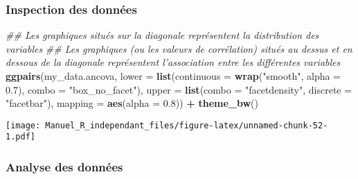 \documentclass[
]{book}
\newenvironment{Shaded}{\begin{snugshade}}{\end{snugshade}}
\newcommand{\CommentTok}[1]{\textcolor[rgb]{0.56,0.35,0.01}{\textit{#1}}}
\newcommand{\DataTypeTok}[1]{\textcolor[rgb]{0.13,0.29,0.53}{#1}}
\newcommand{\FloatTok}[1]{\textcolor[rgb]{0.00,0.00,0.81}{#1}}
\newcommand{\KeywordTok}[1]{\textcolor[rgb]{0.13,0.29,0.53}{\textbf{#1}}}
\newcommand{\NormalTok}[1]{#1}
\newcommand{\OperatorTok}[1]{\textcolor[rgb]{0.81,0.36,0.00}{\textbf{#1}}}
\newcommand{\StringTok}[1]{\textcolor[rgb]{0.31,0.60,0.02}{#1}}
\begin{document}
\hypertarget{inspection-des-donnuxe9es-4}{%
\subsubsection{Inspection des données}\label{inspection-des-donnuxe9es-4}}

\begin{Shaded}
\begin{Highlighting}[]
\CommentTok{## Les graphiques situés sur la diagonale représentent la distribution des variables}
\CommentTok{## Les graphiques (ou les valeurs de corrélation) situés au dessus et en dessous de la diagonale représentent l'association entre les différentes variables}
\KeywordTok{ggpairs}\NormalTok{(my_data.ancova,}
        \DataTypeTok{lower =} \KeywordTok{list}\NormalTok{(}\DataTypeTok{continuous =} \KeywordTok{wrap}\NormalTok{(}\StringTok{"smooth"}\NormalTok{, }\DataTypeTok{alpha =} \FloatTok{0.7}\NormalTok{), }\DataTypeTok{combo =} \StringTok{"box_no_facet"}\NormalTok{),}
        \DataTypeTok{upper =} \KeywordTok{list}\NormalTok{(}\DataTypeTok{combo =} \StringTok{"facetdensity"}\NormalTok{, }\DataTypeTok{discrete =} \StringTok{"facetbar"}\NormalTok{), }
        \DataTypeTok{mapping =} \KeywordTok{aes}\NormalTok{(}\DataTypeTok{alpha =} \FloatTok{0.8}\NormalTok{)) }\OperatorTok{+}\StringTok{ }\KeywordTok{theme_bw}\NormalTok{()}
\end{Highlighting}
\end{Shaded}

\texttt{[image: Manuel\_R\_independant\_files/figure-latex/unnamed-chunk-52-1.pdf]}

\hypertarget{analyse-des-donnuxe9es-5}{%
\subsubsection{Analyse des données}\label{analyse-des-donnuxe9es-5}}
\end{document}
